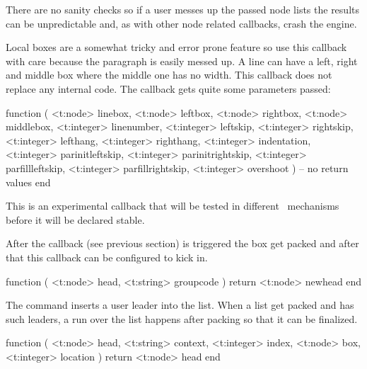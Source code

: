 There are no sanity checks so if a user messes up the passed node lists the results
can be unpredictable and, as with other node related callbacks, crash the engine.

\stopsubsection

\startsubsection[title=local_box]

Local boxes are a somewhat tricky and error prone feature so use this callback
with care because the paragraph is easily messed up. A line can have a left,
right and middle box where the middle one has no width. This callback does not
replace any internal code. The callback gets quite some parameters passed:

\starttyping[option=LUA]
function (
    <t:node>    linebox,
    <t:node>    leftbox,
    <t:node>    rightbox,
    <t:node>    middlebox,
    <t:integer> linenumber,
    <t:integer> leftskip,
    <t:integer> rightskip,
    <t:integer> lefthang,
    <t:integer> righthang,
    <t:integer> indentation,
    <t:integer> parinitleftskip,
    <t:integer> parinitrightskip,
    <t:integer> parfillleftskip,
    <t:integer> parfillrightskip,
    <t:integer> overshoot
)
    -- no return values
end
\stoptyping

This is an experimental callback that will be tested in different \CONTEXT\
mechanisms before it will be declared stable.

\stopsubsection

\startsubsection[title=packed_vbox]

After the  callback (see previous section) is triggered the box get
packed and after that this callback can be configured to kick in.

\starttyping[option=LUA]
function (
    <t:node>   head,
    <t:string> groupcode
)
    return <t:node> newhead
end
\stoptyping

\stopsubsection

\startsubsection[title=handle_uleader]

The \typ {\uleaders} command inserts a user leader into the list. When a list get packed
and has such leaders, a run over the list happens after packing so that it can be
finalized.

\starttyping[option=LUA]
function (
    <t:node>    head,
    <t:string>  context,
    <t:integer> index,
    <t:node>    box,
    <t:integer> location
)
    return <t:node> head
end
\stoptyping

\stopsubsection

\startsubsection[title=italic_correction]

